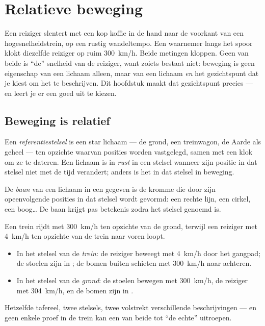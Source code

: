 \chapter{Relatieve beweging}\label{ch:g10:relative-motion}

Een reiziger slentert met een kop koffie in de hand naar de voorkant van
een hogesnelheidstrein, op een rustig wandeltempo. Een waarnemer langs
het spoor klokt diezelfde reiziger op ruim \qty{300}{km/h}. Beide
metingen kloppen. Geen van beide is ``de'' snelheid van de reiziger,
want zoiets bestaat niet: beweging is geen eigenschap van een lichaam
alleen, maar van een lichaam \emph{en} het gezichtspunt dat je kiest om
het te beschrijven. Dit hoofdstuk maakt dat gezichtspunt precies --- en
leert je er een goed uit te kiezen.

\section{Beweging is relatief}

\begin{definition}[Referentiestelsel]\label{def:g10:relative-motion:frame}
Een \emph{referentiestelsel} is een star lichaam
--- de grond, een treinwagon, de Aarde als geheel --- ten opzichte
waarvan posities worden vastgelegd, samen met een klok om ze te dateren.
Een lichaam is in \emph{rust} in een stelsel wanneer zijn
positie in dat stelsel niet met de tijd verandert; anders is het in dat
stelsel in beweging.
\end{definition}

\begin{definition}[Baan]\label{def:g10:relative-motion:trajectory}
De \emph{baan} van een lichaam in een gegeven
 is de kromme die door zijn opeenvolgende posities in
dat stelsel wordt gevormd: een rechte lijn, een cirkel, een boog\dots{}
De baan krijgt pas betekenis zodra het stelsel genoemd is.
\end{definition}

\begin{example}\label{ex:g10:relative-motion:walker}
Een trein rijdt met \qty{300}{km/h} ten opzichte van de grond, terwijl
een reiziger met \qty{4}{km/h} ten opzichte van de trein naar voren
loopt.
\begin{itemize}
  \item In het stelsel van de \emph{trein}: de reiziger beweegt met
        \qty{4}{km/h} door het gangpad; de stoelen zijn in ; de
        bomen buiten schieten met \qty{300}{km/h} naar achteren.
  \item In het stelsel van de \emph{grond}: de stoelen bewegen met
        \qty{300}{km/h}, de reiziger met \qty{304}{km/h}, en de bomen
        zijn in .
\end{itemize}
Hetzelfde tafereel, twee stelsels, twee volstrekt verschillende
beschrijvingen --- en geen enkele proef in de trein kan een van beide
tot ``de echte'' uitroepen.
\end{example}

